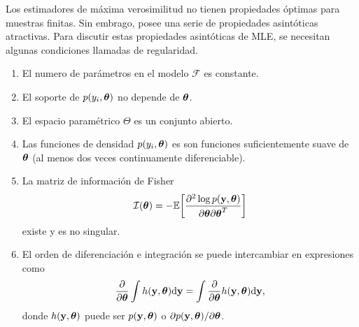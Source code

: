 Los estimadores de máxima verosimilitud no tienen propiedades óptimas para muestras finitas. Sin embrago, posee una serie de propiedades asintóticas atractivas. Para discutir estas propiedades asintóticas de MLE, se necesitan algunas condiciones llamadas de regularidad.
\begin{enumerate}
	\item El numero de parámetros en el modelo $\mathcal{F}$ es constante.
	\item El soporte de $p(y_i,\boldsymbol{\theta})$ no depende de $\boldsymbol{\theta}$.
	\item El espacio paramétrico $\Theta$ es un conjunto abierto.
	\item Las funciones de densidad $p(y_i,\boldsymbol{\theta})$ es son funciones suficientemente suave de $\boldsymbol{\theta}$ (al menos dos veces continuamente diferenciable).
	\item La matriz de información de Fisher
	\begin{equation}
	\mathcal{I}(\boldsymbol{\theta}) = -\mathbb{E}\bigg[\frac{\partial^2\log p(\mathbf{y}, \boldsymbol{\theta})}{\partial\boldsymbol{\theta}\partial\boldsymbol{\theta}^T}\bigg]
	\label{eq:MLE3}
	\end{equation}
	existe y es no singular.
	\item El orden de diferenciación e integración se puede intercambiar en expresiones como
	\[\frac{\partial}{\partial\boldsymbol{\theta}}\int h(\mathbf{y},\boldsymbol{\theta})\mathrm{d}\mathbf{y} = \int\frac{\partial}{\partial\boldsymbol{\theta}}h(\mathbf{y},\boldsymbol{\theta})\mathrm{d}\mathbf{y},\]
	donde $h(\mathbf{y},\boldsymbol{\theta})$ puede ser $p(\mathbf{y},\boldsymbol{\theta})$ o $\partial p(\mathbf{y},\boldsymbol{\theta})/\partial\boldsymbol{\theta}$.
\end{enumerate}


